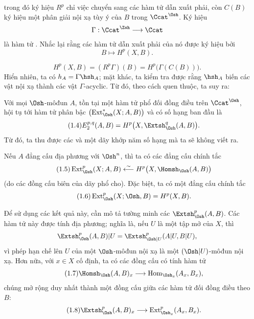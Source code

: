 trong đó ký hiệu $R^{p}$ chỉ việc chuyển sang các hàm tử dẫn xuất phải, còn
$C(B)$ ký hiệu một phân giải nội xạ tùy ý của $B$ trong $\Ccat^{\Osh}$.
Ký hiệu
\[
  \Gamma:\Ccat^{\Zsh}\longrightarrow\Ccat
\]
là hàm tử . Nhắc lại rằng các hàm tử dẫn xuất phải của nó được
ký hiệu bởi
\[
  B\longmapsto H^{p}(X,B).
\]


\begin{equation}\tag{1.3}
  H^{p}(X,B)=(R^{p}\Gamma)(B)=H^{p}\bigl(\Gamma(C(B))\bigr).
\end{equation}
Hiển nhiên, ta có $h_A=\Gamma\hsh_A$; mặt khác, ta kiểm tra được rằng $\hsh_A$
biến các vật nội xạ thành các vật $\Gamma$-acyclic. Từ đó, theo cách quen thuộc,
ta suy ra:

 Với mọi $\Osh$-môđun $A$, tồn tại một hàm tử
phổ đối đồng điều trên $\Ccat^{\Osh}$, hội tụ tới hàm tử phân bậc
$\bigl(\operatorname{Ext}_{\Osh}^{*}(X;A,B)\bigr)$ và có số hạng ban đầu là
\begin{equation}\tag{1.4}
  E_{2}^{p,q}(A,B)=H^{p}\bigl(X,\Extsh_{\Osh}^{q}(A,B)\bigr).
\end{equation}
Từ đó, ta thu được các  và một dãy khớp năm số hạng
mà ta sẽ không viết ra.

 Nếu $A$ đẳng cấu địa phương với $\Osh^{n}$, thì ta có
các đẳng cấu chính tắc
\begin{equation}\tag{1.5}
  \operatorname{Ext}_{\Osh}^{p}(X;A,B)
  \overset{\sim}{\longleftarrow}
  H^{p}\bigl(X,\Homsh_{\Osh}(A,B)\bigr)
\end{equation}
(do các đồng cấu biên của dãy phổ cho). Đặc biệt, ta có
một đẳng cấu chính tắc
\begin{equation}\tag{1.6}
  \operatorname{Ext}_{\Osh}^{p}(X;\Osh,B)=H^{p}(X,B).
\end{equation}

Để sử dụng các kết quả này, cần mô tả tường minh các
$\Extsh_{\Osh}^{p}(A,B)$. Các hàm tử này được tính địa phương;
nghĩa là, nếu $U$ là một tập mở của $X$, thì
\[
  \Extsh_{\Osh}^{p}(A,B)|U
  =\Extsh_{\Osh|U}^{p}(A|U,B|U),
\]
vì phép hạn chế lên $U$ của một $\Osh$-môđun nội xạ
là một $(\Osh|U)$-môđun nội xạ. Hơn nữa, với $x\in X$ cố định, ta có các đồng cấu có tính hàm tử
\begin{equation}\tag{1.7}
  \Homsh_{\Osh}(A,B)_x
  \longrightarrow
  \operatorname{Hom}_{\Osh_x}(A_x,B_x),
\end{equation}
chúng mở rộng duy nhất thành một đồng cấu giữa các hàm tử đối đồng điều
theo $B$:
\begin{equation}\tag{1.8}
  \Extsh_{\Osh}^{p}(A,B)_x
  \longrightarrow
  \operatorname{Ext}_{\Osh_x}^{p}(A_x,B_x).
\end{equation}

